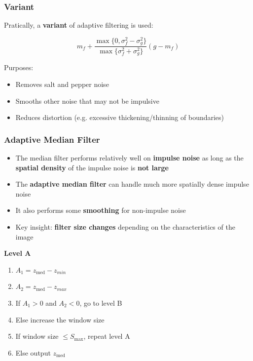 \subsubsection*{Variant}

Pratically, a \textbf{variant} of adaptive filtering is used:

\begin{equation*}
  m_f + \frac{\max \{0, \sigma_f^2 - \sigma_g^2 \}}{\max\{\sigma_f^2
  + \sigma_g^2\}} (g - m_f)
\end{equation*}

Purposes:

\begin{itemize}
  \item Removes salt and pepper noise
  \item Smooths other noise that may not be impulsive
  \item Reduces distortion (e.g. excessive thickening/thinning of boundaries)
\end{itemize}

\subsubsection*{Adaptive Median Filter}

\begin{itemize}
  \item The median filter performs relatively well on \textbf{impulse noise}
    as long as the \textbf{spatial density} of the impulse noise is
    \textbf{not large}
  \item The \textbf{adaptive median filter} can handle much more spatially
    dense impulse noise
  \item It also performs some \textbf{smoothing} for non-impulse noise
  \item Key insight: \textbf{filter size changes} depending on the
    characteristics of the image
\end{itemize}

\textbf{Level A}

\begin{enumerate}
  \item $A_1 = z_\text{med} - z_{min}$
  \item $A_2 = z_\text{med} - z_{max}$
  \item If $A_1 > 0$ and $A_2 < 0$, go to level B
  \item Else increase the window size
  \item If window size $\leq S_\text{max}$, repeat level A
  \item Else output $z_\text{med}$
\end{enumerate}

